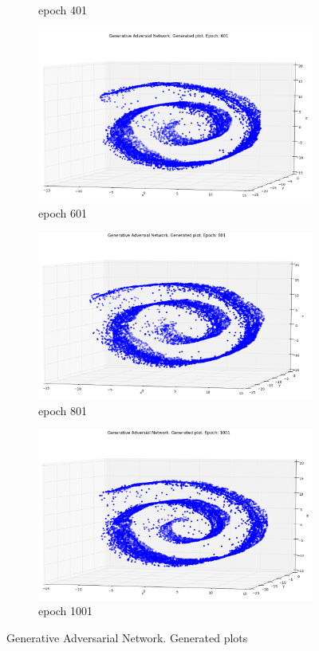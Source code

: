 \begin{figure}
\begin{subfigure}[t]{.4\textwidth}
\caption{epoch 401}
\end{subfigure}%
\begin{subfigure}[t]{.4\textwidth}
\centering
\includegraphics[width=\linewidth]{GANResults/Gen601.png}
\caption{epoch 601}
\end{subfigure}

\medskip

\begin{subfigure}[t]{.4\textwidth}
\centering
\includegraphics[width=\linewidth]{GANResults/Gen801.png}
\caption{epoch 801}
\end{subfigure}%
\begin{subfigure}[t]{.4\textwidth}
\centering
\includegraphics[width=\linewidth]{GANResults/Gen1001.png}
\caption{epoch 1001}
\end{subfigure}
\caption{Generative Adversarial Network. Generated plots }
\label{GANGen}
\end{figure}
